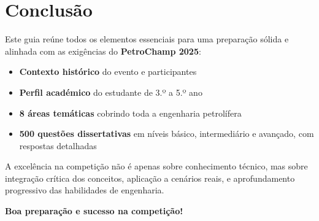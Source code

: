 \documentclass[11pt,a4paper]{article}
\begin{document}
\newpage

\section*{Conclusão}

Este guia reúne todos os elementos essenciais para uma preparação sólida e alinhada com as exigências do \textbf{PetroChamp 2025}:

\begin{itemize}
  \item \textbf{Contexto histórico} do evento e participantes
  \item \textbf{Perfil académico} do estudante de 3.º a 5.º ano
  \item \textbf{8 áreas temáticas} cobrindo toda a engenharia petrolífera
  \item \textbf{500 questões dissertativas} em níveis básico, intermediário e avançado, com respostas detalhadas
\end{itemize}

A excelência na competição não é apenas sobre conhecimento técnico, mas sobre integração crítica dos conceitos, aplicação a cenários reais, e aprofundamento progressivo das habilidades de engenharia.

\vspace{12pt}

\textcolor{accent}{\textbf{Boa preparação e sucesso na competição!}}
\end{document}
